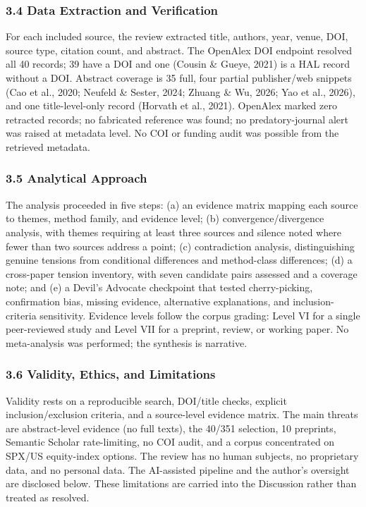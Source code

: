 \documentclass[11pt]{article}
\begin{document}
\subsubsection*{3.4 Data Extraction and Verification}
For each included source, the review extracted title, authors, year, venue, DOI, source type, citation count, and abstract. The OpenAlex DOI endpoint resolved all 40 records; 39 have a DOI and one (Cousin \& Gueye, 2021) is a HAL record without a DOI. Abstract coverage is 35 full, four partial publisher/web snippets (Cao et al., 2020; Neufeld \& Sester, 2024; Zhuang \& Wu, 2026; Yao et al., 2026), and one title-level-only record (Horvath et al., 2021). OpenAlex marked zero retracted records; no fabricated reference was found; no predatory-journal alert was raised at metadata level. No COI or funding audit was possible from the retrieved metadata.

\subsubsection*{3.5 Analytical Approach}
The analysis proceeded in five steps: (a) an evidence matrix mapping each source to themes, method family, and evidence level; (b) convergence/divergence analysis, with themes requiring at least three sources and silence noted where fewer than two sources address a point; (c) contradiction analysis, distinguishing genuine tensions from conditional differences and method-class differences; (d) a cross-paper tension inventory, with seven candidate pairs assessed and a coverage note; and (e) a Devil’s Advocate checkpoint that tested cherry-picking, confirmation bias, missing evidence, alternative explanations, and inclusion-criteria sensitivity. Evidence levels follow the corpus grading: Level VI for a single peer-reviewed study and Level VII for a preprint, review, or working paper. No meta-analysis was performed; the synthesis is narrative.

\subsubsection*{3.6 Validity, Ethics, and Limitations}
Validity rests on a reproducible search, DOI/title checks, explicit inclusion/exclusion criteria, and a source-level evidence matrix. The main threats are abstract-level evidence (no full texts), the 40/351 selection, 10 preprints, Semantic Scholar rate-limiting, no COI audit, and a corpus concentrated on SPX/US equity-index options. The review has no human subjects, no proprietary data, and no personal data. The AI-assisted pipeline and the author’s oversight are disclosed below. These limitations are carried into the Discussion rather than treated as resolved.
\end{document}

